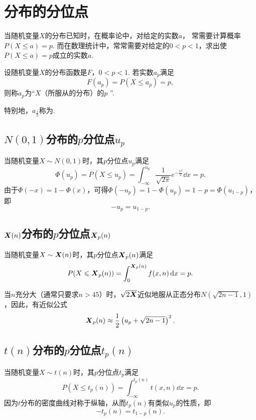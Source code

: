\section{分布的分位点}
当随机变量\(X\)的分布已知时，在概率论中，对给定的实数\(a\)，%
常需要计算概率\(P(X \leqslant a) = p\).
而在数理统计中，常常需要对给定的\(0<p<1\)，求出使\(P(X \leqslant a) = p\)成立的实数\(a\).

\begin{definition}
设随机变量\(X\)的分布函数是\(F\)，\(0<p<1\).
若实数\(a_p\)满足\[
	F(a_p) = P(X \leqslant a_p) = p,
\]则称\(a_p\)为“\(X\)（所服从的分布）的\(p\) ”.

特别地，\(a_{\frac{1}{2}}\)称为.
\end{definition}

\subsection{\texorpdfstring{\(N(0,1)\)分布的\(p\)分位点\(u_p\)}{标准正态分布的p分位点}}
当随机变量\(X \sim N(0,1)\)时，其\(p\)分位点\(u_p\)满足\[
\Phi(u_p)
= P(X \leqslant u_p)
= \int_{-\infty}^{u_p} \frac{1}{\sqrt{2\pi}} e^{-\frac{x^2}{2}} \dd{x}
= p.
\]由于\(\Phi(-x)=1-\Phi(x)\)，可得\(\Phi(-u_p)=1-\Phi(u_p)=1-p=\Phi(u_{1-p})\)，即\begin{equation}
-u_p=u_{1-p}.
\end{equation}

\subsection{\texorpdfstring{\(\boldsymbol{X}(n)\)分布的\(p\)分位点\(\boldsymbol{X}_p(n)\)}{卡方分布的p分位点}}
当随机变量\(X \sim \boldsymbol{X}(n)\)时，其\(p\)分位点\(\boldsymbol{X}_p(n)\)满足\[
P(X \leqslant \boldsymbol{X}_p(n)) = \int_0^{\boldsymbol{X}_p(n)} f(x,n) \dd{x} = p.
\]

当\(n\)充分大（通常只要求\(n>45\)）时，\(\sqrt{2\boldsymbol{X}}\)近似地服从正态分布\(N(\sqrt{2n-1},1)\)，因此，有近似公式\begin{equation}
\boldsymbol{X}_p(n) \approx \frac{1}{2}\left(u_p+\sqrt{2n-1}\right)^2.
\end{equation}

\subsection{\texorpdfstring{\(t(n)\)分布的\(p\)分位点\(t_p(n)\)}{t分布的p分位点}}
当随机变量\(X \sim t(n)\)时，其\(p\)分位点\(t_p\)满足\[
P(X \leqslant t_p(n))
= \int_{-\infty}^{t_p(n)} t(x,n) \dd{x} = p.
\]因为\(t\)分布的密度曲线对称于纵轴，从而\(t_p(n)\)有类似\(u_p\)的性质，即\begin{equation}
-t_p(n)=t_{1-p}(n).
\end{equation}

